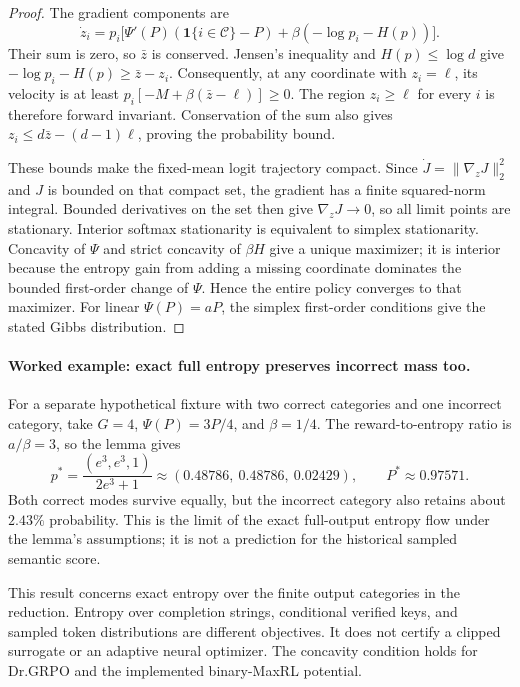 \documentclass{article}
\newcommand{\1}{\mathbf 1}
\theoremstyle{remark}
\theoremstyle{definition}
\theoremstyle{plain}
\begin{document}
\begin{proof}
The gradient components are
\[
 \dot z_i=p_i\bigl[\Psi'(P)(\1\{i\in\mathcal C\}-P)
       +\beta(-\log p_i-H(p))\bigr].
\]
Their sum is zero, so $\bar z$ is conserved. Jensen's inequality and
$H(p)\le\log d$ give
$-\log p_i-H(p)\ge\bar z-z_i$.
Consequently, at any coordinate with $z_i=\ell$, its velocity is at least
$p_i[-M+\beta(\bar z-\ell)]\ge0$. The region $z_i\ge\ell$ for every $i$
is therefore forward invariant. Conservation of the sum also gives
$z_i\le d\bar z-(d-1)\ell$, proving the probability bound.

These bounds make the fixed-mean logit trajectory compact.
Since $\dot J=\|\nabla_zJ\|_2^2$ and $J$ is bounded on that compact set,
the gradient has a finite squared-norm integral. Bounded derivatives on the
set then give $\nabla_zJ\to0$, so all limit points are stationary.
Interior softmax stationarity is equivalent to simplex stationarity.
Concavity of $\Psi$ and strict concavity of $\beta H$ give a unique maximizer;
it is interior because the entropy gain from adding a missing coordinate
dominates the bounded first-order change of $\Psi$. Hence the entire policy
converges to that maximizer. For linear $\Psi(P)=aP$, the simplex
first-order conditions give the stated Gibbs distribution.
\end{proof}

\paragraph{Worked example: exact full entropy preserves incorrect mass too.}
For a separate hypothetical fixture with two correct categories and one
incorrect category, take $G=4$, $\Psi(P)=3P/4$, and $\beta=1/4$.
The reward-to-entropy ratio is $a/\beta=3$, so the lemma gives
\[
 p^*=\frac{(e^3,e^3,1)}{2e^3+1}
       \approx(0.48786,\ 0.48786,\ 0.02429),
 \qquad P^*\approx0.97571.
\]
Both correct modes survive equally, but the incorrect category also retains
about $2.43\%$ probability. This is the limit of the exact full-output
entropy flow under the lemma's assumptions; it is not a prediction for the
historical sampled semantic score.

This result concerns exact entropy over the finite output categories in the
reduction. Entropy over completion strings, conditional verified keys, and
sampled token distributions are different objectives. It does not certify a
clipped surrogate or an adaptive neural optimizer. The concavity condition
holds for Dr.GRPO and the implemented binary-MaxRL potential.
\end{document}
